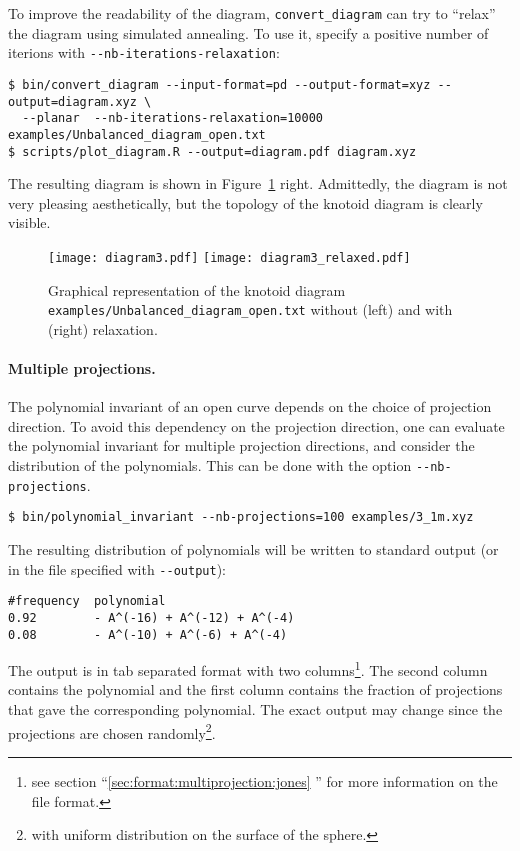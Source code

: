 To improve the readability of the diagram, \lstinline{convert_diagram} can try to ``relax'' the diagram using simulated annealing. To use it, specify a positive number of iterions with \lstinline{--nb-iterations-relaxation}:
\begin{lstlisting}
$ bin/convert_diagram --input-format=pd --output-format=xyz --output=diagram.xyz \
  --planar  --nb-iterations-relaxation=10000 examples/Unbalanced_diagram_open.txt
$ scripts/plot_diagram.R --output=diagram.pdf diagram.xyz
\end{lstlisting}
The resulting diagram is shown in Figure~\ref{fig:diagram3} right. Admittedly, the diagram is not very pleasing aesthetically, but the topology of the knotoid diagram is clearly visible.
\begin{figure}[t]
\centering
\texttt{[image: diagram3.pdf]}
\texttt{[image: diagram3\_relaxed.pdf]}
\caption{Graphical representation of the knotoid diagram \lstinline{examples/Unbalanced_diagram_open.txt} without (left) and with (right) relaxation.}\label{fig:diagram3}
\end{figure}


\paragraph{Multiple projections.}
The polynomial invariant of an open curve depends on the choice of projection direction. To avoid this dependency on the projection direction, one can evaluate the polynomial invariant for multiple projection directions, and consider the distribution of the polynomials. This can be done with the option \lstinline{--nb-projections}. 
\begin{lstlisting}
$ bin/polynomial_invariant --nb-projections=100 examples/3_1m.xyz
\end{lstlisting}
The resulting distribution of polynomials will be written to standard output (or in the file specified with \lstinline{--output}):
\begin{lstlisting}
#frequency  polynomial
0.92	    - A^(-16) + A^(-12) + A^(-4)
0.08	    - A^(-10) + A^(-6) + A^(-4)
\end{lstlisting}
The output is in tab separated format with two columns\footnote{see section ``\ref{sec:format:multiprojection:jones} '' for more information on the file format.}. The second column contains the polynomial and the first column contains the fraction of projections that gave the corresponding polynomial. The exact output may change since the projections are chosen randomly\footnote{with uniform distribution on the surface of the sphere.}.

